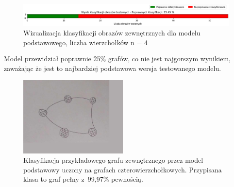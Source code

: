 \begin{figure}[ht]
	\centering
	\includegraphics[width=15.5cm]{resources/tests/images/v3/base4_bar.png}
	\caption{Wizualizacja klasyfikacji obrazów zewnętrznych dla modelu podstawowego, liczba wierzchołków n = 4}
	\label{Fig:tests-base-1c}
\end{figure}
\FloatBarrier

Model przewidział poprawnie 25\% grafów, co nie jest najgorszym wynikiem,
zaważając że jest to najbardziej podstawowa wersja testowanego modelu.

\begin{figure}[ht]
	\centering
	\includegraphics[height=4cm]{../graph_classification/test_graphs/drawn/cycle-1.png}
	\caption{Klasyfikacja przykładowego grafu zewnętrznego przez model podstawowy uczony na grafach czterowierzchołkowych.
		Przypisana klasa to graf pełny z~99,97\% pewnością.}
	\label{Fig:tests-base-1d}
\end{figure}
\FloatBarrier




